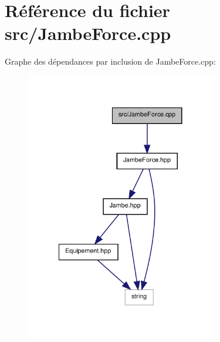 \section{Référence du fichier src/\-Jambe\-Force.cpp}
\label{_jambe_force_8cpp}
Graphe des dépendances par inclusion de Jambe\-Force.\-cpp\-:\nopagebreak
\begin{figure}[H]
\begin{center}
\leavevmode
\includegraphics[width=236pt]{_jambe_force_8cpp__incl}
\end{center}
\end{figure}
